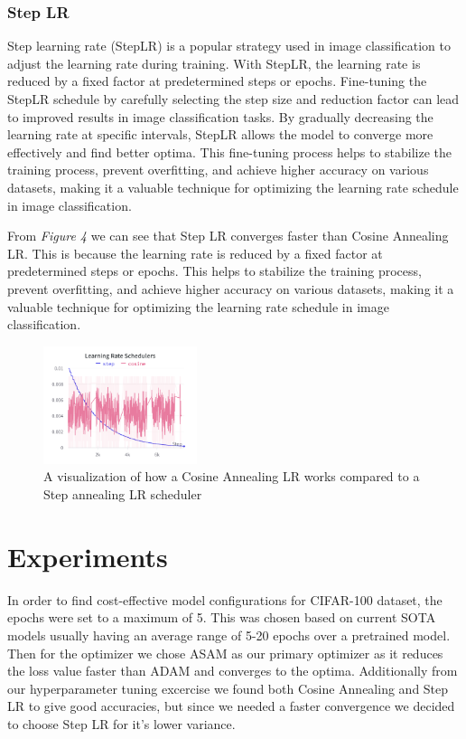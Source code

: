 \documentclass{article}
\begin{document}
\subsubsection{Step LR}
Step learning rate (StepLR) is a popular strategy used in image classification to adjust the learning rate during training.
With StepLR, the learning rate is reduced by a fixed factor at predetermined steps or epochs.
Fine-tuning the StepLR schedule by carefully selecting the step size and reduction factor can lead to improved results in image classification tasks.
By gradually decreasing the learning rate at specific intervals, StepLR allows the model to converge more effectively and find better optima.
This fine-tuning process helps to stabilize the training process, prevent overfitting, and achieve higher accuracy on various datasets, making it a valuable technique for optimizing the learning rate schedule in image classification.

From \textit{Figure 4} we can see that Step LR converges faster than Cosine Annealing LR.
This is because the learning rate is reduced by a fixed factor at predetermined steps or epochs.
This helps to stabilize the training process, prevent overfitting, and achieve higher accuracy on various datasets, making it a valuable technique for optimizing the learning rate schedule in image classification.

\begin{figure}[ht]
    \vskip 0.2in
    \centering
    \includegraphics[width=0.4\textwidth]{learning_rate_schedulers.png}
    \caption{A visualization of how a Cosine Annealing LR works compared to a Step annealing LR scheduler}
    \label{fig:foobar}
    \vskip -0.2in
\end{figure}


\section{Experiments}
In order to find cost-effective model configurations for CIFAR-100 dataset, the epochs were set to a maximum of 5.
This was chosen based on current SOTA models usually having an average range of 5-20 epochs over a pretrained model.
Then for the optimizer we chose ASAM as our primary optimizer as it reduces the loss value faster than ADAM and converges to the optima.
Additionally from our hyperparameter tuning excercise we found both Cosine Annealing and Step LR to give good accuracies, but since we needed a faster convergence we decided to choose Step LR for it's lower variance.
\end{document}
